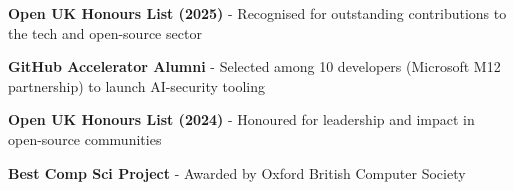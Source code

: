 \documentclass[]{resume-format}
\begin{document}

\vspace{0.5mm}
\begin{cvachievements}
\setlength{\itemsep}{0mm}
  \item { \textbf{ Open UK Honours List (2025) } - Recognised for outstanding contributions to the tech and open-source sector \href{ https://openuk.uk/honours/ }{\scriptsize\color{lightgray}\faLink} }
  \item { \textbf{ GitHub Accelerator Alumni } - Selected among 10 developers (Microsoft M12 partnership) to launch AI-security tooling \href{ https://accelerator.github.com/ }{\scriptsize\color{lightgray}\faLink} }
  \item { \textbf{ Open UK Honours List (2024) } - Honoured for leadership and impact in open-source communities \href{ https://openuk.uk/community/openuk-honours-lists/2024-honours-list }{\scriptsize\color{lightgray}\faLink} }
  \item { \textbf{ Best Comp Sci Project } - Awarded by Oxford British Computer Society \href{ https://oxon.bcs.org/2016/06/27/annual-student-prizes-2016/ }{\scriptsize\color{lightgray}\faLink} }
\end{cvachievements}


\end{document}
